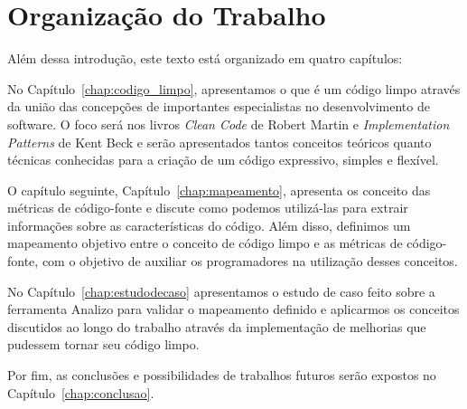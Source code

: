 \section{Organização do Trabalho}
\label{sec:organizacao_trabalho}

Além dessa introdução, este texto está organizado em quatro capítulos:

No Capítulo~\ref{chap:codigo_limpo}, apresentamos o que é um código limpo através
da união das concepções de importantes especialistas no desenvolvimento de software.
O foco será nos livros \textit{Clean Code} de Robert Martin \citep{Martin2008} e \textit{Implementation
Patterns} de Kent Beck \citep{Beck2007} e serão apresentados tantos conceitos teóricos
quanto técnicas conhecidas para a criação de um código expressivo, simples e flexível.

O capítulo seguinte, Capítulo~\ref{chap:mapeamento}, apresenta os conceito das métricas de
código-fonte e discute como podemos utilizá-las para extrair informações sobre
as características do código. Além disso, definimos um mapeamento objetivo entre
o conceito de código limpo e as métricas de código-fonte, com o objetivo de
auxiliar os programadores na utilização desses conceitos.

No Capítulo~\ref{chap:estudodecaso} apresentamos o estudo de caso feito sobre a ferramenta Analizo para
validar o mapeamento definido e aplicarmos os conceitos discutidos ao longo do trabalho através da implementação de melhorias que pudessem
tornar seu código limpo.

Por fim, as conclusões e possibilidades de trabalhos futuros serão expostos no Capítulo~\ref{chap:conclusao}.
